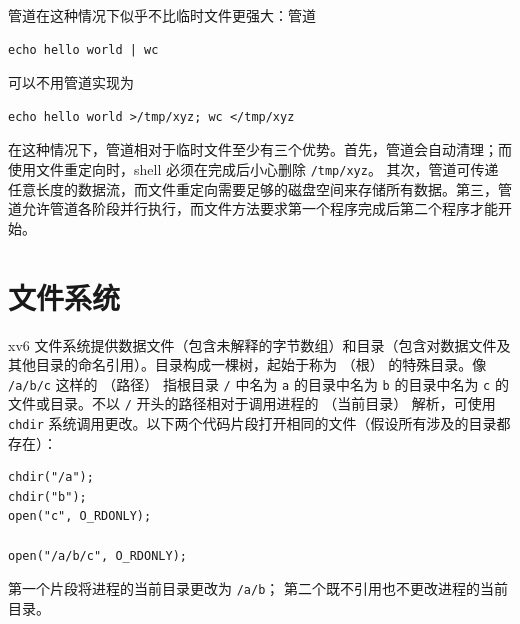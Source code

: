 
管道在这种情况下似乎不比临时文件更强大：管道
\begin{lstlisting}[]
echo hello world | wc
\end{lstlisting}
可以不用管道实现为
\begin{lstlisting}[]
echo hello world >/tmp/xyz; wc </tmp/xyz
\end{lstlisting}
在这种情况下，管道相对于临时文件至少有三个优势。首先，管道会自动清理；而使用文件重定向时，shell 必须在完成后小心删除
\lstinline{/tmp/xyz}。
其次，管道可传递任意长度的数据流，而文件重定向需要足够的磁盘空间来存储所有数据。第三，管道允许管道各阶段并行执行，而文件方法要求第一个程序完成后第二个程序才能开始。
\section{文件系统}

xv6 文件系统提供数据文件（包含未解释的字节数组）和目录（包含对数据文件及其他目录的命名引用）。目录构成一棵树，起始于称为
（根）
的特殊目录。像
\lstinline{/a/b/c}
这样的
（路径）
指根目录
\lstinline{/}
中名为
\lstinline{a}
的目录中名为
\lstinline{b}
的目录中名为
\lstinline{c}
的文件或目录。不以
\lstinline{/}
开头的路径相对于调用进程的
（当前目录）
解析，可使用
\lstinline{chdir}
系统调用更改。以下两个代码片段打开相同的文件（假设所有涉及的目录都存在）：
\begin{lstlisting}[]
chdir("/a");
chdir("b");
open("c", O_RDONLY);

open("/a/b/c", O_RDONLY);
\end{lstlisting}
第一个片段将进程的当前目录更改为
\lstinline{/a/b}；
第二个既不引用也不更改进程的当前目录。

